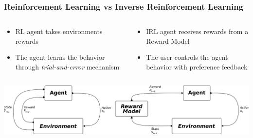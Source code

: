 
\begin{frame}
	\frametitle{Reinforcement Learning vs Inverse Reinforcement Learning}
	
 	\begin{columns}
		\begin{column}{0.5\textwidth}
			
			\begin{itemize}
				\item<1-> RL agent takes environments rewards
				\item<2-> The agent learns the behavior through \textit{trial-and-error} mechanism
			\end{itemize}
			
		\end{column}
		\begin{column}{0.5\textwidth}
			\begin{itemize}
				\item<1-> IRL agent receives rewards from a Reward Model
				\item<2-> The user controls the agent behavior with preference feedback 
			\end{itemize}			
		\end{column}
		
	\end{columns}
	\vspace{1cm}
	\centering
	\includegraphics[width=1\linewidth]{images/IRL+RL.png}

\end{frame}

